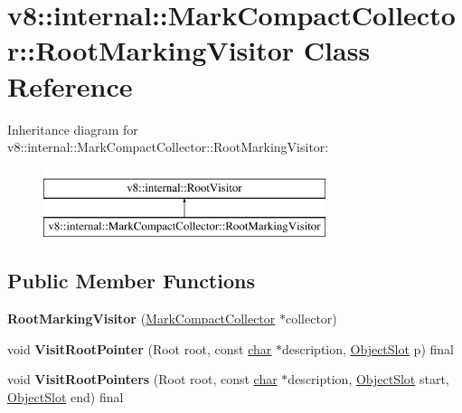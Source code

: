 \hypertarget{classv8_1_1internal_1_1MarkCompactCollector_1_1RootMarkingVisitor}{}\section{v8\+:\+:internal\+:\+:Mark\+Compact\+Collector\+:\+:Root\+Marking\+Visitor Class Reference}
\label{classv8_1_1internal_1_1MarkCompactCollector_1_1RootMarkingVisitor}
Inheritance diagram for v8\+:\+:internal\+:\+:Mark\+Compact\+Collector\+:\+:Root\+Marking\+Visitor\+:\begin{figure}[H]
\begin{center}
\leavevmode
\includegraphics[height=2.000000cm]{classv8_1_1internal_1_1MarkCompactCollector_1_1RootMarkingVisitor}
\end{center}
\end{figure}
\subsection*{Public Member Functions}
\begin{DoxyCompactItemize}
\item 
\mbox{\label{classv8_1_1internal_1_1MarkCompactCollector_1_1RootMarkingVisitor_a4be3627c36c83e468567f19fe5aef938}} 
{\bfseries Root\+Marking\+Visitor} (\mbox{\hyperlink{classv8_1_1internal_1_1MarkCompactCollector}{Mark\+Compact\+Collector}} $\ast$collector)
\item 
\mbox{\label{classv8_1_1internal_1_1MarkCompactCollector_1_1RootMarkingVisitor_a11138d2d59dc4ca56385450b8c743b98}} 
void {\bfseries Visit\+Root\+Pointer} (Root root, const \mbox{\hyperlink{classchar}{char}} $\ast$description, \mbox{\hyperlink{classv8_1_1internal_1_1ObjectSlot}{Object\+Slot}} p) final
\item 
\mbox{\label{classv8_1_1internal_1_1MarkCompactCollector_1_1RootMarkingVisitor_abedfc4a99a3146bfdd3d9db7849cdb89}} 
void {\bfseries Visit\+Root\+Pointers} (Root root, const \mbox{\hyperlink{classchar}{char}} $\ast$description, \mbox{\hyperlink{classv8_1_1internal_1_1ObjectSlot}{Object\+Slot}} start, \mbox{\hyperlink{classv8_1_1internal_1_1ObjectSlot}{Object\+Slot}} end) final
\end{DoxyCompactItemize}
